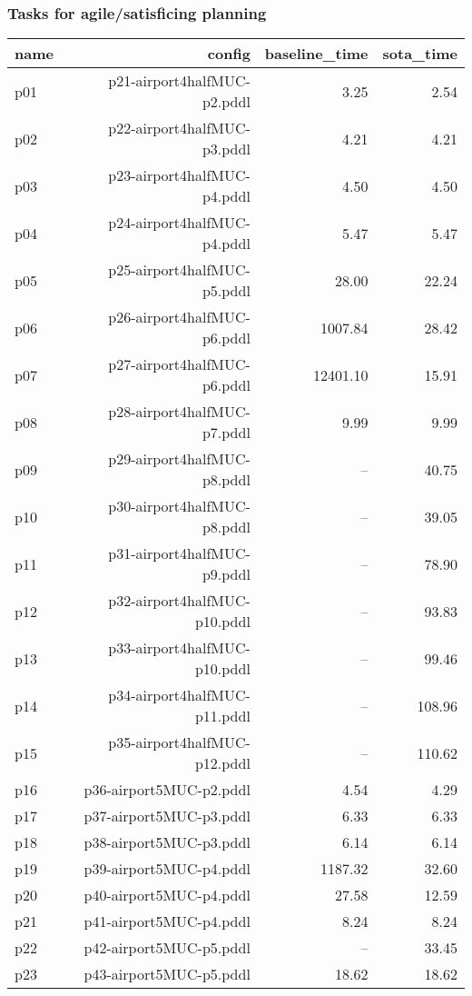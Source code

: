 \documentclass{article}
\begin{document}
                    \subsubsection*{Tasks for agile/satisficing planning}
                    
                            \begin{center}
                            \scriptsize
                            \begin{tabular}{@{}l|r|r|r@{}}
                            name & config & baseline\_time & sota\_time\\\midrule
                              p01& p21-airport4halfMUC-p2.pddl&3.25&2.54\\
  p02& p22-airport4halfMUC-p3.pddl&4.21&4.21\\
  p03& p23-airport4halfMUC-p4.pddl&4.50&4.50\\
  p04& p24-airport4halfMUC-p4.pddl&5.47&5.47\\
  p05& p25-airport4halfMUC-p5.pddl&28.00&22.24\\
  p06& p26-airport4halfMUC-p6.pddl&1007.84&28.42\\
  p07& p27-airport4halfMUC-p6.pddl&12401.10&15.91\\
  p08& p28-airport4halfMUC-p7.pddl&9.99&9.99\\
  p09& p29-airport4halfMUC-p8.pddl&--&40.75\\
  p10& p30-airport4halfMUC-p8.pddl&--&39.05\\
  p11& p31-airport4halfMUC-p9.pddl&--&78.90\\
  p12& p32-airport4halfMUC-p10.pddl&--&93.83\\
  p13& p33-airport4halfMUC-p10.pddl&--&99.46\\
  p14& p34-airport4halfMUC-p11.pddl&--&108.96\\
  p15& p35-airport4halfMUC-p12.pddl&--&110.62\\
  p16& p36-airport5MUC-p2.pddl&4.54&4.29\\
  p17& p37-airport5MUC-p3.pddl&6.33&6.33\\
  p18& p38-airport5MUC-p3.pddl&6.14&6.14\\
  p19& p39-airport5MUC-p4.pddl&1187.32&32.60\\
  p20& p40-airport5MUC-p4.pddl&27.58&12.59\\
  p21& p41-airport5MUC-p4.pddl&8.24&8.24\\
  p22& p42-airport5MUC-p5.pddl&--&33.45\\
  p23& p43-airport5MUC-p5.pddl&18.62&18.62\\

\end{tabular}
\end{center}
\end{document}
